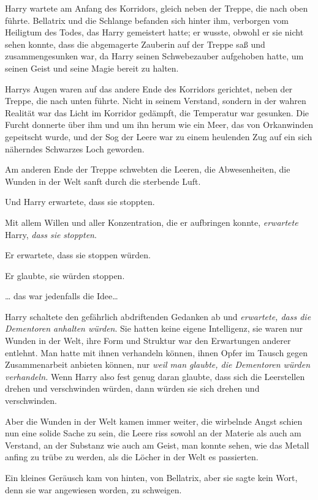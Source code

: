 {Harry wartete am Anfang des Korridors, gleich neben der Treppe, die nach oben führte. Bellatrix und die Schlange befanden sich hinter ihm, verborgen vom Heiligtum des Todes, das Harry gemeistert hatte; er wusste, obwohl er sie nicht sehen konnte, dass die abgemagerte Zauberin auf der Treppe saß und zusammengesunken war, da Harry seinen Schwebezauber aufgehoben hatte, um seinen Geist und seine Magie bereit zu halten.

Harrys Augen waren auf das andere Ende des Korridors gerichtet, neben der Treppe, die nach unten führte. Nicht in seinem Verstand, sondern in der wahren Realität war das Licht im Korridor gedämpft, die Temperatur war gesunken. Die Furcht donnerte über ihm und um ihn herum wie ein Meer, das von Orkanwinden gepeitscht wurde, und der Sog der Leere war zu einem heulenden Zug auf ein sich näherndes Schwarzes Loch geworden.

Am anderen Ende der Treppe schwebten die Leeren, die Abwesenheiten, die Wunden in der Welt sanft durch die sterbende Luft.

Und Harry erwartete, dass sie stoppten.

Mit allem Willen und aller Konzentration, die er aufbringen konnte, \emph{erwartete} Harry, \emph{dass sie} \emph{stoppten}.

Er erwartete, dass sie stoppen würden.

Er glaubte, sie würden stoppen.

… das war jedenfalls die Idee…

Harry schaltete den gefährlich abdriftenden Gedanken ab und \emph{erwartete, dass die Dementoren anhalten würden}. Sie hatten keine eigene Intelligenz, sie waren nur Wunden in der Welt, ihre Form und Struktur war den Erwartungen anderer entlehnt. Man hatte mit ihnen verhandeln können, ihnen Opfer im Tausch gegen Zusammenarbeit anbieten können, nur \emph{weil man glaubte, die Dementoren würden verhandeln.} Wenn Harry also fest genug daran glaubte, dass sich die Leerstellen drehen und verschwinden würden, dann würden sie sich drehen und verschwinden.

Aber die Wunden in der Welt kamen immer weiter, die wirbelnde Angst schien nun eine solide Sache zu sein, die Leere riss sowohl an der Materie als auch am Verstand, an der Substanz wie auch am Geist, man konnte sehen, wie das Metall anfing zu trübe zu werden, als die Löcher in der Welt es passierten.

Ein kleines Geräusch kam von hinten, von Bellatrix, aber sie sagte kein Wort, denn sie war angewiesen worden, zu schweigen.

}
